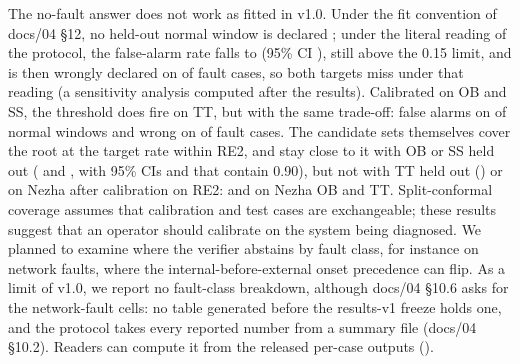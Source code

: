 The no-fault answer does not work as fitted in v1.0.
Under the fit convention of docs/04 §12, no held-out normal window is declared \NOFAULT; under the literal reading of the protocol, the false-alarm rate falls to  (95\% CI ), still above the 0.15 limit, and \NOFAULT is then wrongly declared on  of fault cases, so both targets miss under that reading (a sensitivity analysis computed after the results).
Calibrated on OB and SS, the threshold does fire on TT, but with the same trade-off: false alarms on  of normal windows and wrong \NOFAULT on  of fault cases.
The candidate sets themselves cover the root at the target rate within RE2, and stay close to it with OB or SS held out ( and , with 95\% CIs  and  that contain 0.90), but not with TT held out () or on Nezha after calibration on RE2:  and  on Nezha OB and TT.
Split-conformal coverage assumes that calibration and test cases are exchangeable; these results suggest that an operator should calibrate on the system being diagnosed.
We planned to examine where the verifier abstains by fault class, for instance on network faults, where the internal-before-external onset precedence can flip.
As a limit of v1.0, we report no fault-class breakdown, although docs/04 §10.6 asks for the network-fault cells: no table generated before the results-v1 freeze holds one, and the protocol takes every reported number from a summary file (docs/04 §10.2).
Readers can compute it from the released per-case outputs ().

